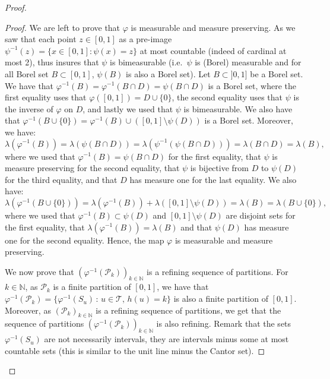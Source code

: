 \documentclass{amsart}
\newcommand{\ie}{i.e.\ }
\theoremstyle{plain}
\theoremstyle{definition}
\newcommand{\cP}{\mathcal{P}}
\newcommand{\cT}{\mathcal{T}}
\newcommand{\N}{\mathbb{N}}
\begin{document}
\begin{proof}
\begin{proof}
We are left to prove that $\varphi$ is measurable and measure preserving.
As we saw that each point $z\in[0,1]$ as a pre-image 
	$\psi^{-1}(z) = \{ x\in[0,1] : \psi(x) =z \}$ at most countable
	(indeed of cardinal at most 2),
	thus \cite{purves} insures that $\psi$ is bimeasurable
	(\ie $\psi$ is (Borel) measurable and for all Borel set $B\subset [0,1]$,
		$\psi(B)$ is also a Borel set).
Let $B\subset ]0,1]$ be a Borel set. We have that
$ \varphi^{-1}(B) = \varphi^{-1}(B\cap D) = \psi(B\cap D)$ is a Borel set,
	where the first equality uses that $\varphi([0,1]) = D\cup \{0\}$,
	the second equality uses that $\psi$ is the inverse of $\varphi$ on $D$,
	and lastly we used that $\psi$ is bimeasurable.
We also have that $\varphi^{-1}(B\cup\{0\}) = \varphi^{-1}(B) \cup ([0,1]\setminus \psi(D))$ 
		is  a Borel set.
Moreover, we have:
	\[ \lambda(\varphi^{-1}(B)) 
		= \lambda(\psi(B\cap D)) 
		= \lambda( \psi^{-1}( \psi(B\cap D))) 
		= \lambda(B\cap D)
		= \lambda(B) , \]
	where we used that $\varphi^{-1}(B) = \psi(B\cap D)$ for the first equality,
	that $\psi$ is measure preserving for the second equality,
	that $\psi$ is bijective from $D$ to $\psi(D)$ for the third equality,
	and that $D$ has measure one for the last equality.
We also have:	
\[ \lambda(\varphi^{-1}(B\cup\{0\})) 
		= \lambda( \varphi^{-1}(B) ) + \lambda( [0,1]\setminus \psi(D) )
		= \lambda(B) = \lambda( B \cup\{0\}) , \]
	where we used that $\varphi^{-1}(B)\subset \psi(D)$ and $[0,1]\setminus \psi(D)$ are disjoint sets
		for the first equality,
	that $\lambda(\varphi^{-1}(B)) = \lambda(B)$ and that $\psi(D)$ has measure one
		for the second equality.
Hence, the map $\varphi$ is measurable and measure preserving.

\medskip

We now prove that $(\varphi^{-1}(\cP_k))_{k\in\N}$ is a refining sequence of partitions.
For $k\in\N$, as $\cP_k$ is a finite partition of $[0,1]$,
	we have that $\varphi^{-1}(\cP_k) = \{ \varphi^{-1}(S_u) \, : \, u\in\cT,\, h(u)=k \}$
	is also a finite partition of $[0,1]$.
Moreover, as $(\cP_k)_{k\in\N}$ is a refining sequence of  partitions, we get  that
the sequence of partitions $(\varphi^{-1}(\cP_k))_{k\in\N}$ is also refining.
Remark that the sets $\varphi^{-1}(S_u)$ are not necessarily intervals,
	they are intervals minus some at most countable sets
	(this is similar to the unit line minus the Cantor set). 

\medskip


\end{proof}
\end{proof}
\end{document}
